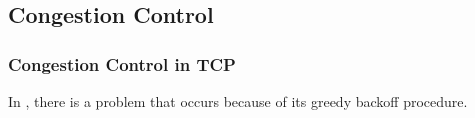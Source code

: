 \subsection{Congestion Control}\label{subsec:Congestion_Control}

\subsubsection{Congestion Control in TCP}\label{subsubsec:Congestion_Control_TCP}
In , there is a problem that occurs because of its greedy backoff procedure.



